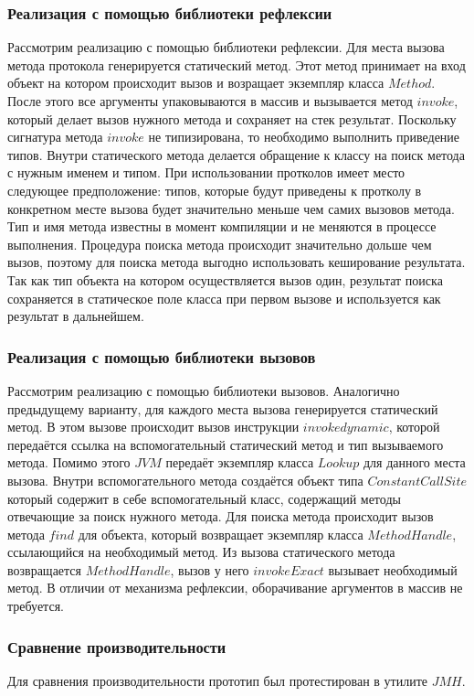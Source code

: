\subsubsection{Реализация с помощью библиотеки рефлексии}
Рассмотрим реализацию с помощью библиотеки рефлексии. Для места вызова метода протокола генерируется статический метод. Этот метод принимает на вход объект на котором происходит вызов и возращает экземпляр класса $Method$. После этого все аргументы упаковываются в массив и вызывается метод $invoke$, который делает вызов нужного метода и сохраняет на стек результат. Поскольку сигнатура метода $invoke$ не типизирована, то необходимо выполнить приведение типов. Внутри статического метода делается обращение к классу на поиск метода с нужным именем и типом. При использовании протколов имеет место следующее предположение: типов, которые будут приведены к протколу в конкретном месте вызова будет значительно меньше чем самих вызовов метода. Тип и имя метода известны в момент компиляции и не меняются в процессе выполнения. Процедура поиска метода происходит значительно дольше чем вызов, поэтому для поиска метода выгодно использовать кеширование результата. Так как тип объекта на котором осуществляется вызов один, результат поиска сохраняется в статическое поле класса при первом вызове и используется как результат в дальнейшем.

\subsubsection{Реализация с помощью библиотеки вызовов}
Рассмотрим реализацию с помощью библиотеки вызовов. Аналогично предыдущему варианту, для каждого места вызова генерируется статический метод. В этом вызове происходит вызов инструкции $invokedynamic$, которой передаётся ссылка на вспомогательный статический метод и тип вызываемого метода. Помимо этого $JVM$ передаёт экземпляр класса $Lookup$ для данного места вызова. Внутри вспомогательного метода создаётся объект типа $ConstantCallSite$ который содержит в себе вспомогательный класс, содержащий методы отвечающие за поиск нужного метода. Для поиска метода происходит вызов метода $find$ для объекта, который возвращает экземпляр класса $MethodHandle$, ссылающийся на необходимый метод. Из вызова статического метода возвращается $MethodHandle$, вызов у него $invokeExact$ вызывает необходимый метод. В отличии от механизма рефлексии, оборачивание аргументов в массив не требуется.

\subsubsection{Сравнение производительности}
Для сравнения производительности прототип был протестирован в утилите $JMH$.
